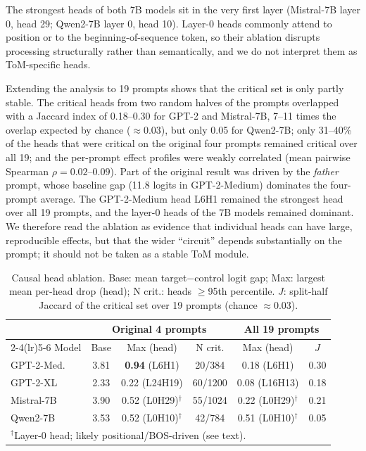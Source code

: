 \documentclass[conference]{IEEEtran}
\begin{document}
The strongest heads of both 7B models sit in the very first layer (Mistral-7B layer 0, head 29; Qwen2-7B layer 0, head 10). Layer-0 heads commonly attend to position or to the beginning-of-sequence token, so their ablation disrupts processing structurally rather than semantically, and we do not interpret them as ToM-specific heads.

Extending the analysis to 19 prompts shows that the critical set is only partly stable. The critical heads from two random halves of the prompts overlapped with a Jaccard index of 0.18--0.30 for GPT-2 and Mistral-7B, 7--11 times the overlap expected by chance ($\approx 0.03$), but only 0.05 for Qwen2-7B; only 31--40\% of the heads that were critical on the original four prompts remained critical over all 19; and the per-prompt effect profiles were weakly correlated (mean pairwise Spearman $\rho = 0.02$--$0.09$). Part of the original result was driven by the \textit{father} prompt, whose baseline gap (11.8 logits in GPT-2-Medium) dominates the four-prompt average. The GPT-2-Medium head L6H1 remained the strongest head over all 19 prompts, and the layer-0 heads of the 7B models remained dominant. We therefore read the ablation as evidence that individual heads can have large, reproducible effects, but that the wider ``circuit'' depends substantially on the prompt; it should not be taken as a stable ToM module.

\begin{table}[t]
\centering
\caption{Causal head ablation. Base: mean target$-$control logit gap; Max: largest mean per-head drop (head); N crit.: heads $\geq$95th percentile. $J$: split-half Jaccard of the critical set over 19 prompts (chance $\approx 0.03$).}
\label{tab:ablation}
\vskip 0.05in
\footnotesize
\setlength{\tabcolsep}{2.5pt}
\begin{tabular}{lccccc}
\toprule
 & \multicolumn{3}{c}{Original 4 prompts} & \multicolumn{2}{c}{All 19 prompts} \\
\cmidrule(lr){2-4}\cmidrule(lr){5-6}
Model & Base & Max (head) & N crit. & Max (head) & $J$ \\
\midrule
GPT-2-Med.  & 3.81 & \textbf{0.94} (L6H1) & 20/384 & 0.18 (L6H1) & 0.30 \\
GPT-2-XL    & 2.33 & 0.22 (L24H19) & 60/1200 & 0.08 (L16H13) & 0.18 \\
Mistral-7B  & 3.90 & 0.52 (L0H29)$^\dagger$ & 55/1024 & 0.22 (L0H29)$^\dagger$ & 0.21 \\
Qwen2-7B    & 3.53 & 0.52 (L0H10)$^\dagger$ & 42/784 & 0.51 (L0H10)$^\dagger$ & 0.05 \\
\bottomrule
\multicolumn{6}{l}{$^\dagger$Layer-0 head; likely positional/BOS-driven (see text).}
\end{tabular}
\end{table}
\end{document}
